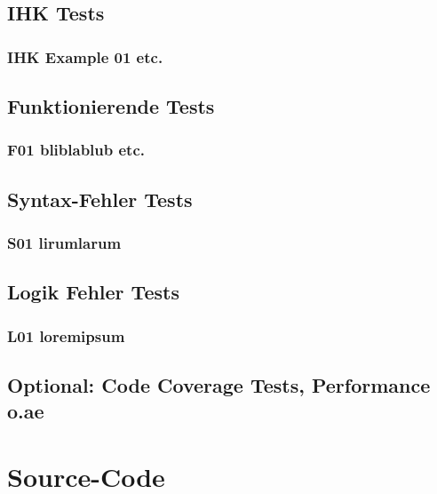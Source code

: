 \documentclass[a4paper,11pt]{article}
\begin{document}
{\subsection{IHK Tests}

\subsubsection{IHK Example 01 etc.}

\subsection{Funktionierende Tests}

\subsubsection{F01 bliblablub etc.}

\subsection{Syntax-Fehler Tests}

\subsubsection{S01 lirumlarum}

\subsection{Logik Fehler Tests}

\subsubsection{L01 loremipsum}

\subsection{Optional: Code Coverage Tests, Performance o.ae}

\section{Source-Code}
\begin{center}


\end{center}}
\end{document}
